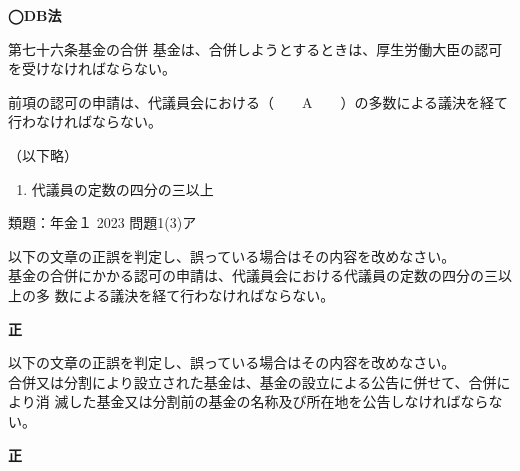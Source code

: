 \begin{fillblank}[年金1 H29 問題1(1)B]
  \noindent \textbf{◯DB法}
  \begin{lawstructure}
    \begin{lawarticle}{第七十六条}{基金の合併}
      基金は、合併しようとするときは、厚生労働大臣の認可を受けなければならない。

      前項の認可の申請は、代議員会における（　　A　　）の多数による議決を経て行わなければならない。
    
      （以下略）
    \end{lawarticle}
  \end{lawstructure}
\end{fillblank}

\begin{answerbox}
  \begin{enumerate}[A: ]
    \item 代議員の定数の四分の三以上
  \end{enumerate}
\end{answerbox}

\begin{explanationbox}
  類題：年金１ 2023 問題1(3)ア
\end{explanationbox}

\begin{truefalse}[年金2 2022 問題1(1)(エ)\ajRoman{1}]
  以下の文章の正誤を判定し、誤っている場合はその内容を改めなさい。
\\

  基金の合併にかかる認可の申請は、代議員会における代議員の定数の四分の三以上の多
数による議決を経て行わなければならない。
\end{truefalse}

\begin{answerbox}
  \textbf{正}
\end{answerbox}

\begin{truefalse}[年金2 2022 問題1(1)(エ)\ajRoman{4}]
  以下の文章の正誤を判定し、誤っている場合はその内容を改めなさい。
\\

  合併又は分割により設立された基金は、基金の設立による公告に併せて、合併により消
滅した基金又は分割前の基金の名称及び所在地を公告しなければならない。
\end{truefalse}

\begin{answerbox}
  \textbf{正}
\end{answerbox}


